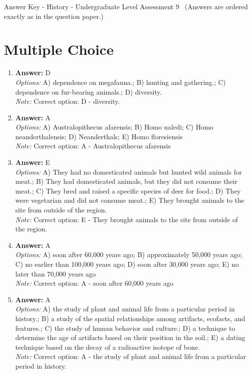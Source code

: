 \documentclass[12pt]{article}
\begin{document}
\begin{center}
Answer Key - History - Undergraduate Level Assessment 9 \
\small (Answers are ordered exactly as in the question paper.)
\end{center}

\section*{Multiple Choice}
\begin{enumerate}[label=\arabic*.]
\item \textbf{Answer:} D
\\ \textit{Options:} A) dependence on megafauna.; B) hunting and gathering.; C) dependence on fur-bearing animals.; D) diversity.
\\ \textit{Note:} Correct option: D - diversity.
\item \textbf{Answer:} A
\\ \textit{Options:} A) Australopithecus afarensis; B) Homo naledi; C) Homo neanderthalensis; D) Neanderthals; E) Homo floresiensis
\\ \textit{Note:} Correct option: A - Australopithecus afarensis
\item \textbf{Answer:} E
\\ \textit{Options:} A) They had no domesticated animals but hunted wild animals for meat.; B) They had domesticated animals, but they did not consume their meat.; C) They bred and raised a specific species of deer for food.; D) They were vegetarian and did not consume meat.; E) They brought animals to the site from outside of the region.
\\ \textit{Note:} Correct option: E - They brought animals to the site from outside of the region.
\item \textbf{Answer:} A
\\ \textit{Options:} A) soon after 60,000 years ago; B) approximately 50,000 years ago; C) no earlier than 100,000 years ago; D) soon after 30,000 years ago; E) no later than 70,000 years ago
\\ \textit{Note:} Correct option: A - soon after 60,000 years ago
\item \textbf{Answer:} A
\\ \textit{Options:} A) the study of plant and animal life from a particular period in history.; B) a study of the spatial relationships among artifacts, ecofacts, and features.; C) the study of human behavior and culture.; D) a technique to determine the age of artifacts based on their position in the soil.; E) a dating technique based on the decay of a radioactive isotope of bone.
\\ \textit{Note:} Correct option: A - the study of plant and animal life from a particular period in history.
\end{enumerate}
\end{document}

